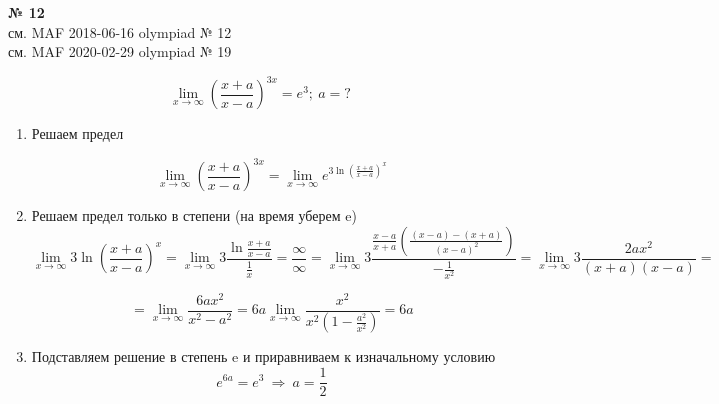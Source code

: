 \documentclass{article}
\begin{document}
\textbf{№ 12} 
\large
\\
см. MAF 2018-06-16 olympiad № 12 \\
см. MAF 2020-02-29 olympiad № 19

$$ \lim\limits_{x \to \infty} \left( \frac{x+a}{x-a} \right)^{3x} = e^3; \ a = ? $$  

\begin{enumerate}
\item Решаем предел

$$ \lim\limits_{x \to \infty} \left( \frac{x+a}{x-a} \right)^{3x}
= \lim\limits_{x \to \infty} e^{3\ln{\left( \frac{x+a}{x-a} \right)^x}} $$

\item Решаем предел только в степени (на время уберем e)
$$ \lim\limits_{x \to \infty} 3\ln{\left( \frac{x+a}{x-a} \right)^x} 
= \lim\limits_{x \to \infty} 3\frac{\ln{\frac{x+a}{x-a}}}{\frac{1}{x}}  
= \frac{\infty}{\infty}
= \lim\limits_{x \to \infty} 3\frac{ \frac{x-a}{x+a} \left( \frac{(x-a)-(x+a)}{(x-a)^2} \right) }{-\frac{1}{x^2}} 
= \lim\limits_{x \to \infty} 3\frac{2ax^2}{(x+a)(x-a)} 
= $$

$$ = \lim\limits_{x \to \infty} \frac{6ax^2}{x^2-a^2}  
= 6a \lim\limits_{x \to \infty} \frac{x^2}{x^2 \left(1 - \frac{a^2}{x^2} \right)} 
= 6a $$

\item Подставляем решение в степень e и приравниваем к изначальному условию
$$ e^{6a} = e^3 \ \Rightarrow \ a = \frac{1}{2} $$

\end{enumerate}
\end{document}
